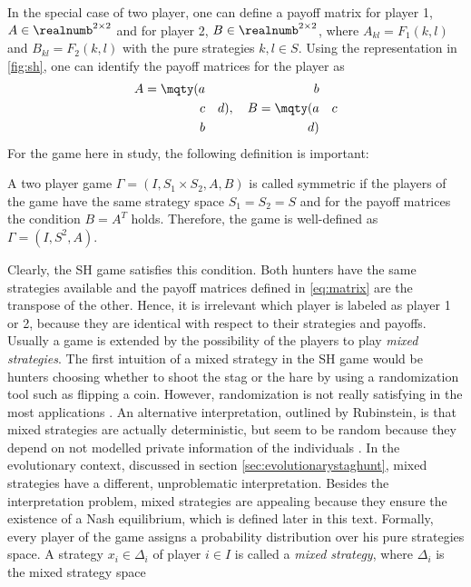 In the special case of two player, one 
can define a payoff matrix for player 1, $A \in \realnumb^{2 \times2}$ and for 
player 2,  $B \in \realnumb^{2 \times2}$, where $A_{kl} = F_1(k,l)$ and $
B_{kl} = F_2(k,l)$ with the pure strategies $k,l \in S$. Using the 
representation in \ref{fig:sh}, one can identify the payoff matrices for 
the player as
\begin{align}
     A = \mqty(a && b \\ c && d), \quad B = \mqty(a && c \\ b && d)
        \label{eq:matrix}
\end{align}
For the game here in study, the following definition is important: 
\begin{mydef}
        A two player game $\Gamma=(I,S_1 \times S_2, A,B)$ is called symmetric
        if the players of the game have the same strategy space $S_1=S_2=S$ and
        for the payoff matrices the condition $B=A^T$ holds. Therefore, the
        game is well-defined as $\Gamma=(I,S^2,A)$.
        \label{symmetry}
\end{mydef}
Clearly, the SH game satisfies this condition. Both hunters have the same 
strategies available and the payoff matrices defined in 
\eqref{eq:matrix}  are the transpose of the other.
Hence, it is irrelevant which player is labeled as player 1 or 2, because 
they are identical with respect to their strategies and payoffs.
Usually a game is extended by the possibility of the players to play
\textit{mixed strategies}. 
The first intuition of a mixed strategy in the SH game would be hunters
choosing whether to shoot the stag or the hare by using a randomization
tool such as flipping a coin. However, randomization is not really
satisfying in the most applications \parencite{radner_private_1982}. An
alternative interpretation, outlined by Rubinstein, is that mixed 
strategies are actually deterministic, but seem to be random because they 
depend on not modelled private information of the individuals 
\parencite[914]{rubinstein_comments_1991}. In the evolutionary context,
discussed in section \ref{sec:evolutionarystaghunt}, mixed strategies have
a different, unproblematic interpretation. Besides the interpretation problem,
mixed strategies are appealing because they ensure the existence
of a Nash equilibrium, which is defined later in this text.
Formally, every player of the game assigns a probability distribution over
his pure strategies space. A strategy $x_i \in \Delta_i$ of 
player $i \in I$ is called a \textit{mixed strategy}, where $\Delta_i$ is 
the mixed strategy space 
